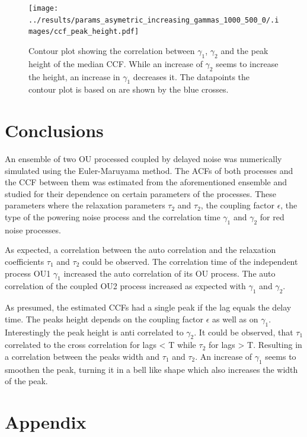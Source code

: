 \documentclass[a4paper,12pt,oneside]{book}
\theoremstyle{break}
\begin{document}
\begin{figure}
	\texttt{[image: ../results/params\_asymetric\_increasing\_gammas\_1000\_500\_0/.images/ccf\_peak\_height.pdf]}%
	\caption{Contour plot showing the correlation between $\gamma_1$, $\gamma_2$ and the peak height of the median CCF. While an increase of $\gamma_2$ seems to increase the height, an increase in $\gamma_1$ decreases it. The datapoints  the contour plot is based on are shown by the blue crosses.}%
	\label{f/r/ccf_white_asym_correlation_gamma_peak_height}
\end{figure}

\chapter{Conclusions}\label{ch/conclusion}
An ensemble of two OU processed coupled by delayed noise was numerically simulated using the Euler-Maruyama method.
The ACFs of both processes and the CCF between them was estimated from the aforementioned ensemble and studied for their dependence on certain parameters of the processes. These parameters where the relaxation parameters $\tau_2$ and  $\tau_2$, the coupling factor $\epsilon$, the type of the powering noise process and the correlation time $\gamma_1$ and $\gamma_2$ for red noise processes.

As expected, a correlation between the auto correlation and the relaxation coefficients $\tau_1$ and  $\tau_2$ could be observed.
The correlation time of the independent process OU1 $\gamma_1$ increased the auto correlation of its OU process. 
The auto correlation of the coupled OU2 process increased as expected with $\gamma_1$ and $\gamma_2$.

As presumed, the estimated CCFs had a single peak if the lag equals the delay time.
The peaks height depends on the coupling factor $\epsilon$ as well as on $\gamma_1$. Interestingly the peak height is anti correlated to $\gamma_2$.
It could be observed, that $\tau_1$ correlated to the cross correlation for lags < T while $\tau_2$ for lags > T. Resulting in a correlation between the peaks width and $\tau_1$ and $\tau_2$.
An increase of $\gamma_1$ seems to smoothen the peak, turning it in a bell like shape which also increases the width of the peak.

\chapter{Appendix}\label{ch/appendix}
\end{document}

